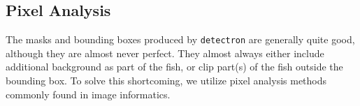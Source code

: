 \documentclass[screen,review]{acmart}
\begin{document}

\subsection{Pixel Analysis}
The masks and bounding boxes produced by \verb|detectron| are generally quite good, although they are almost never perfect. They almost always either include additional background as part of the fish, or clip part(s) of the fish outside the bounding box. To solve this shortcoming, we utilize pixel analysis methods commonly found in image informatics.
\end{document}
